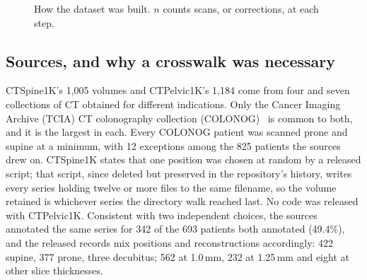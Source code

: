 \documentclass[aapm,mph,amsmath,amssymb,preprint,linenumbers]{revtex4-2}
\begin{document}
\begin{figure}[t]
\caption{How the dataset was built. $n$ counts scans, or corrections, at each step.}
\label{fig:pipeline}
\end{figure}

\subsection{Sources, and why a crosswalk was necessary}\label{sec:sources}
CTSpine1K's 1{,}005 volumes and CTPelvic1K's 1{,}184 come from four and seven collections of
CT obtained for different indications. Only the Cancer Imaging Archive (TCIA) CT colonography
collection (COLONOG)~\cite{colonog,tcia} is common to both, and it is the largest in each.
Every COLONOG patient was scanned prone and supine at a minimum, with 12
exceptions among the 825 patients the sources drew on. CTSpine1K states that one position was
chosen at random by a released script; that script, since deleted but preserved in the
repository's history, writes every series holding twelve or more files to the same filename,
so the volume retained is whichever series the directory walk reached last. No code was
released with CTPelvic1K. Consistent with two independent choices, the sources annotated the
same series for 342 of the 693 patients both annotated (49.4\%), and the released records mix
positions and reconstructions accordingly: 422 supine, 377 prone, three decubitus; 562 at
1.0\,mm, 232 at 1.25\,mm and eight at other slice thicknesses.
\end{document}
